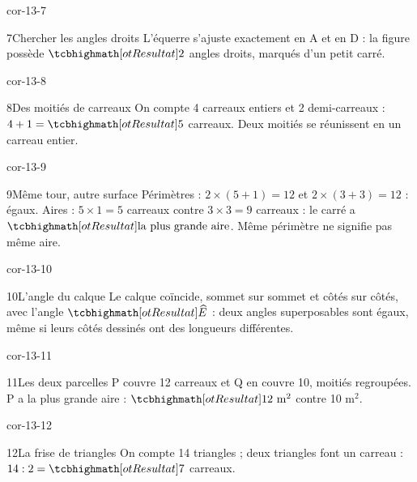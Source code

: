 \begin{blocLivre}{cor-13-7}\begin{corrige}{7}{Chercher les angles droits}
L’équerre s’ajuste exactement en A et en D : la figure possède $\res2$ angles droits, marqués d’un petit carré.
\label{fig-cor-13-7}
\end{corrige}\end{blocLivre}
\begin{blocLivre}{cor-13-8}\begin{corrige}{8}{Des moitiés de carreaux}
On compte 4 carreaux entiers et 2 demi-carreaux : $4+1=\res5$ carreaux. Deux moitiés se réunissent en un carreau entier.
\label{fig-cor-13-8}
\end{corrige}\end{blocLivre}
\begin{blocLivre}{cor-13-9}\begin{corrige}{9}{Même tour, autre surface}
Périmètres : $2\times(5+1)=12$ et $2\times(3+3)=12$ : égaux. Aires : $5\times1=5$ carreaux contre $3\times3=9$ carreaux : le carré a $\res{\text{la plus grande aire}}$. Même périmètre ne signifie pas même aire.
\label{fig-cor-13-9}
\end{corrige}\end{blocLivre}
\begin{blocLivre}{cor-13-10}\begin{corrige}{10}{L’angle du calque}
Le calque coïncide, sommet sur sommet et côtés sur côtés, avec l’angle $\res{\widehat{E}}$ : deux angles superposables sont égaux, même si leurs côtés dessinés ont des longueurs différentes.
\label{fig-cor-13-10}
\end{corrige}\end{blocLivre}
\begin{blocLivre}{cor-13-11}\begin{corrige}{11}{Les deux parcelles}
P couvre 12 carreaux et Q en couvre 10, moitiés regroupées. P a la plus grande aire : $\res{12\ \mathrm m^2}$ contre 10 $\mathrm m^2$.
\label{fig-cor-13-11}
\end{corrige}\end{blocLivre}
\begin{blocLivre}{cor-13-12}\begin{corrige}{12}{La frise de triangles}
On compte 14 triangles ; deux triangles font un carreau : $14:2=\res7$ carreaux.
\label{fig-cor-13-12}
\end{corrige}\end{blocLivre}
